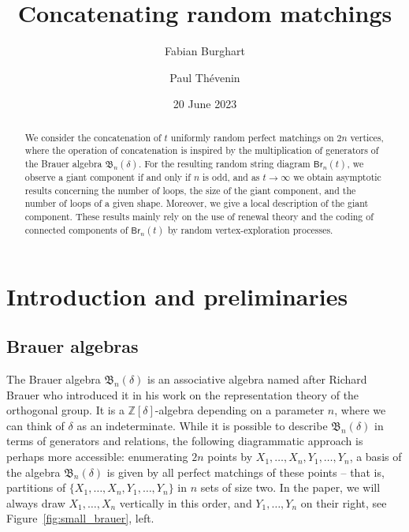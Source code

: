\documentclass[a4paper,11pt,reqno]{amsart}
\title{Concatenating random matchings}
\author[F. Burghart]{Fabian Burghart}
\author[P. Th\'{e}venin]{Paul Th\'{e}venin}
\date{20 June 2023}
\newcommand{\paul}[1]{\todo[color=yellow!70,inline]{Paul: #1}}
\newcommand{\Z}{\mathbb{Z}}
\newcommand{\kB}{\mathfrak{B}}
\newcommand{\Br}{\mathsf{Br}}
\theoremstyle{definition}
\begin{document}
\begin{abstract}
We consider the concatenation of $t$ uniformly random perfect matchings on $2n$ vertices, where the operation of concatenation is inspired by the multiplication of generators of the Brauer algebra $\kB_n(\delta)$. For the resulting random string diagram $\Br_n(t)$, we observe a giant component if and only if $n$ is odd, and as $t\to\infty$ we obtain asymptotic results concerning the number of loops, the size of the giant component, and the number of loops of a given shape. Moreover, we give a local description of the giant component. These results mainly rely on the use of renewal theory and the coding of connected components of $\Br_n(t)$ by random vertex-exploration processes.
\end{abstract}

\maketitle



% 
% 

\section{Introduction and preliminaries}

\subsection*{Brauer algebras}

The Brauer algebra $\kB_n(\delta)$ is an associative algebra named after Richard Brauer who introduced it in his work \cite{Bra37} on the representation theory of the orthogonal group. It is a $\Z[\delta]$-algebra depending on a parameter $n$, where we can think of $\delta$ as an indeterminate. While it is possible to describe $\kB_n(\delta)$ in terms of generators and relations, the following diagrammatic approach is perhaps more accessible: enumerating $2n$ points by $X_1, \dots, X_n, Y_1, \dots, Y_n$, a basis of the algebra $\kB_n(\delta)$ is given by all perfect matchings of these points -- that is, partitions of $\{ X_1, \dots, X_n, Y_1, \dots, Y_n\}$ in $n$ sets of size two. In the paper, we will always draw $X_1, \dots, X_n$ vertically in this order, and $Y_1, \dots, Y_n$ on their right, see Figure~\ref{fig:small_brauer}, left. 
\end{document}
